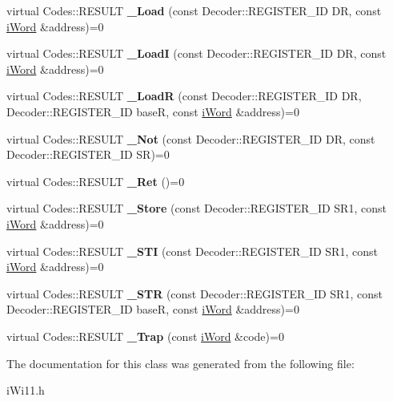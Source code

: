 \begin{DoxyCompactItemize}
\item 
\hypertarget{classiWi11_aed1f870b129617436434bb6dcee521ce}{
virtual Codes::RESULT {\bfseries \_\-Load} (const Decoder::REGISTER\_\-ID DR, const \hyperlink{classiWord}{iWord} \&address)=0}
\label{classiWi11_aed1f870b129617436434bb6dcee521ce}

\item 
\hypertarget{classiWi11_ab8f6fc32bfc363f9798c795320c00894}{
virtual Codes::RESULT {\bfseries \_\-LoadI} (const Decoder::REGISTER\_\-ID DR, const \hyperlink{classiWord}{iWord} \&address)=0}
\label{classiWi11_ab8f6fc32bfc363f9798c795320c00894}

\item 
\hypertarget{classiWi11_a47fd64cc3629f9239c75fa4fea753c41}{
virtual Codes::RESULT {\bfseries \_\-LoadR} (const Decoder::REGISTER\_\-ID DR, Decoder::REGISTER\_\-ID baseR, const \hyperlink{classiWord}{iWord} \&address)=0}
\label{classiWi11_a47fd64cc3629f9239c75fa4fea753c41}

\item 
\hypertarget{classiWi11_a942ecd7956af6ad9c65c976b968d7832}{
virtual Codes::RESULT {\bfseries \_\-Not} (const Decoder::REGISTER\_\-ID DR, const Decoder::REGISTER\_\-ID SR)=0}
\label{classiWi11_a942ecd7956af6ad9c65c976b968d7832}

\item 
\hypertarget{classiWi11_ae6c1048642dbf2c03c60062f6aaabfd2}{
virtual Codes::RESULT {\bfseries \_\-Ret} ()=0}
\label{classiWi11_ae6c1048642dbf2c03c60062f6aaabfd2}

\item 
\hypertarget{classiWi11_a52659070aca67bf8fba76f059bc120aa}{
virtual Codes::RESULT {\bfseries \_\-Store} (const Decoder::REGISTER\_\-ID SR1, const \hyperlink{classiWord}{iWord} \&address)=0}
\label{classiWi11_a52659070aca67bf8fba76f059bc120aa}

\item 
\hypertarget{classiWi11_a3a299e4526c8c9865f529cc10e293a0c}{
virtual Codes::RESULT {\bfseries \_\-STI} (const Decoder::REGISTER\_\-ID SR1, const \hyperlink{classiWord}{iWord} \&address)=0}
\label{classiWi11_a3a299e4526c8c9865f529cc10e293a0c}

\item 
\hypertarget{classiWi11_a5002f010e61f0677feb9f8a116504a0c}{
virtual Codes::RESULT {\bfseries \_\-STR} (const Decoder::REGISTER\_\-ID SR1, const Decoder::REGISTER\_\-ID baseR, const \hyperlink{classiWord}{iWord} \&address)=0}
\label{classiWi11_a5002f010e61f0677feb9f8a116504a0c}

\item 
\hypertarget{classiWi11_a74da9304180f3cbece4b7e87e8a53a5d}{
virtual Codes::RESULT {\bfseries \_\-Trap} (const \hyperlink{classiWord}{iWord} \&code)=0}
\label{classiWi11_a74da9304180f3cbece4b7e87e8a53a5d}

\end{DoxyCompactItemize}


The documentation for this class was generated from the following file:\begin{DoxyCompactItemize}
\item 
iWi11.h\end{DoxyCompactItemize}

